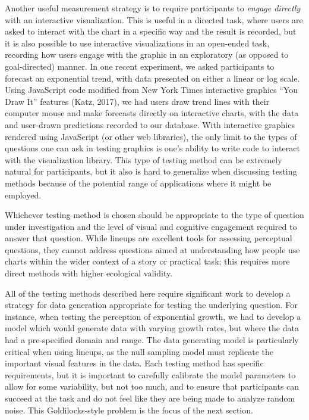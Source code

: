 \documentclass[
  10pt,
  letterpaper,
  DIV=11,
  numbers=noendperiod]{scrartcl}
\begin{document}
Another useful measurement strategy is to require participants to
\emph{engage directly} with an interactive visualization. This is useful
in a directed task, where users are asked to interact with the chart in
a specific way and the result is recorded, but it is also possible to
use interactive visualizations in an open-ended task, recording how
users engage with the graphic in an exploratory (as opposed to
goal-directed) manner. In one recent experiment, we asked participants
to forecast an exponential trend, with data presented on either a linear
or log scale. Using JavaScript code modified from New York Times
interactive graphics ``You Draw It'' features (Katz, 2017), we had users
draw trend lines with their computer mouse and make forecasts directly
on interactive charts, with the data and user-drawn predictions recorded
to our database. With interactive graphics rendered using JavaScript (or
other web libraries), the only limit to the types of questions one can
ask in testing graphics is one's ability to write code to interact with
the visualization library. This type of testing method can be extremely
natural for participants, but it also is hard to generalize when
discussing testing methods because of the potential range of
applications where it might be employed.

Whichever testing method is chosen should be appropriate to the type of
question under investigation and the level of visual and cognitive
engagement required to answer that question. While lineups are excellent
tools for assessing perceptual questions, they cannot address questions
aimed at understanding how people use charts within the wider context of
a story or practical task; this requires more direct methods with higher
ecological validity.

All of the testing methods described here require significant work to
develop a strategy for data generation appropriate for testing the
underlying question. For instance, when testing the perception of
exponential growth, we had to develop a model which would generate data
with varying growth rates, but where the data had a pre-specified domain
and range. The data generating model is particularly critical when using
lineups, as the null sampling model must replicate the important visual
features in the data. Each testing method has specific requirements, but
it is important to carefully calibrate the model parameters to allow for
some variability, but not too much, and to ensure that participants can
succeed at the task and do not feel like they are being made to analyze
random noise. This Goldilocks-style problem is the focus of the next
section.
\end{document}
